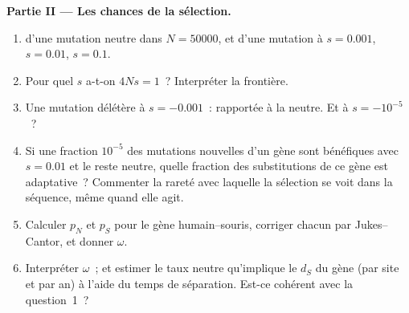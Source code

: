 \begin{problem}
\medskip
\noindent\textbf{Partie II --- Les chances de la sélection.}
\begin{enumerate}[resume]
  \item {} d'une mutation neutre dans
        $N = \num{50000}$, et d'une mutation à $s = 0.001$, $s = 0.01$,
        $s = 0.1$.
  \item Pour quel $s$ a-t-on $4Ns = 1$~? Interpréter la frontière.
  \item Une mutation délétère à $s = -0.001$~: 
        rapportée à la neutre. Et à $s = -10^{-5}$~?
  \item Si une fraction $10^{-5}$ des mutations nouvelles d'un gène sont
        bénéfiques avec $s = 0.01$ et le reste neutre, quelle fraction
        des substitutions de ce gène est adaptative~? Commenter la
        rareté avec laquelle la sélection se voit dans la séquence, même
        quand elle agit.
  \item Calculer $p_{N}$ et $p_{S}$ pour le gène humain--souris, corriger
        chacun par Jukes--Cantor, et donner $\omega$.
  \item Interpréter $\omega$~; et estimer le taux neutre qu'implique le
        $d_{S}$ du gène (par site et par an) à l'aide du temps de
        séparation. Est-ce cohérent avec la question~1~?
\end{enumerate}


\end{problem}
